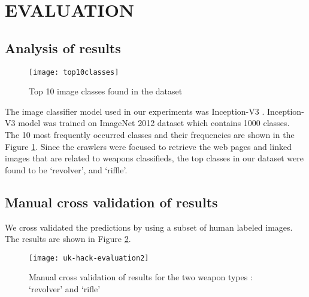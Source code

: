 \section {EVALUATION} \label{sec:evaluation}

\subsection{Analysis of results}
\begin{figure}[h]
	\texttt{[image: top10classes]}
	\caption{Top 10 image classes found in the dataset}
	\label{fig:top10ImgClass}
\end{figure}
The image classifier model used in our experiments was Inception-V3 \cite{SzegedyVISW15}. Inception-V3 model was trained on ImageNet 2012 dataset which contains 1000 classes\cite{ILSVRC15}.
The 10 most frequently occurred classes and their frequencies are shown in the Figure \ref{fig:top10ImgClass}. Since the crawlers were focused to retrieve the web pages and linked images that are related to weapons classifieds, the top classes in our dataset were found to be `revolver', and `riffle'.

\subsection{Manual cross validation of results}
We cross validated the predictions by using a subset of human labeled images. The results are shown in Figure \ref{fig:uk-hack-eval}.  
\begin{figure}[h]
	\texttt{[image: uk-hack-evaluation2]}
	\caption{Manual cross validation of results for the two weapon types : `revolver' and `rifle'}
	\label{fig:uk-hack-eval}
\end{figure}

